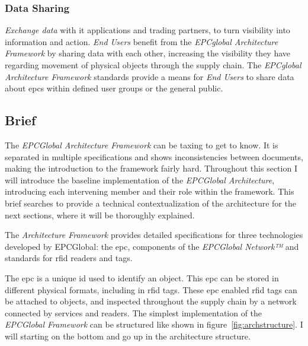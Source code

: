 \subsubsection{Data Sharing} 

\emph{Exchange data} with \ac{it} applications and trading partners, to turn visibility into information and action.
\emph{End Users} benefit from the \emph{EPCglobal Architecture Framework} by sharing data with each other, increasing the visibility they have regarding movement of physical objects through the supply chain. 
The \emph{EPCglobal Architecture Framework} standards provide a means for \emph{End Users} to share data about \acp{epc} within defined user groups or the general public. 



\subsection{Brief}



The \emph{EPCGlobal Architecture Framework} can be taxing to get to know. It is separated in multiple specifications and shows inconsistencies between documents, making the introduction to the framework fairly hard.
Throughout this section I will introduce the baseline implementation of the \emph{EPCGlobal Architecture}, introducing each intervening member and their role within the framework. This brief searches to provide a technical contextualization of the architecture for the next sections, where it will be thoroughly explained.

The \emph{Architecture Framework} provides detailed specifications for three technologies developed by EPCGlobal: the \acf{epc}, components of the \emph{EPCGlobal Network™} and standards for \ac{rfid} readers and tags.

The \ac{epc} is a unique \acs{id} used to identify an object. This \ac{epc} can be stored in different physical formats, including in \ac{rfid} tags. 
These \ac{epc} enabled \ac{rfid} tags can be attached to objects, and inspected throughout the supply chain by a network connected by services and readers.
The simplest implementation of the \emph{EPCGlobal Framework} can be structured like shown in figure~\ref{fig:archstructure}.
I will starting on the bottom and go up in the architecture structure.

